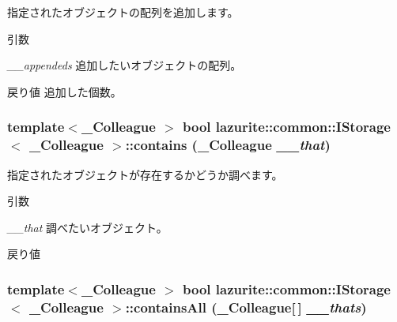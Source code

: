 指定されたオブジェクトの配列を追加します。 
\begin{DoxyParams}{引数}
\item[{\em \_\-\_\-appendeds}]追加したいオブジェクトの配列。\end{DoxyParams}
\begin{DoxyReturn}{戻り値}
追加した個数。
\end{DoxyReturn}
\hypertarget{interfacelazurite_1_1common_1_1_i_storage_3_01___colleague_01_4_ab2f74d6daf8be72d92c6d0aa3f2abce8}{
\subsubsection[{contains}]{\setlength{\rightskip}{0pt plus 5cm}template$<$\_\-Colleague $>$ bool lazurite::common::IStorage$<$ \_\-Colleague $>$::contains (\_\-Colleague {\em \_\-\_\-that})}}
\label{interfacelazurite_1_1common_1_1_i_storage_3_01___colleague_01_4_ab2f74d6daf8be72d92c6d0aa3f2abce8}


指定されたオブジェクトが存在するかどうか調べます。 
\begin{DoxyParams}{引数}
\item[{\em \_\-\_\-that}]調べたいオブジェクト。\end{DoxyParams}
\begin{DoxyReturn}{戻り値}

\end{DoxyReturn}
\hypertarget{interfacelazurite_1_1common_1_1_i_storage_3_01___colleague_01_4_a0b96167e28d2d2769ec81f74d7860dab}{
\subsubsection[{containsAll}]{\setlength{\rightskip}{0pt plus 5cm}template$<$\_\-Colleague $>$ bool lazurite::common::IStorage$<$ \_\-Colleague $>$::containsAll (\_\-Colleague\mbox{[}$\,$\mbox{]} {\em \_\-\_\-thats})}}
\label{interfacelazurite_1_1common_1_1_i_storage_3_01___colleague_01_4_a0b96167e28d2d2769ec81f74d7860dab}


